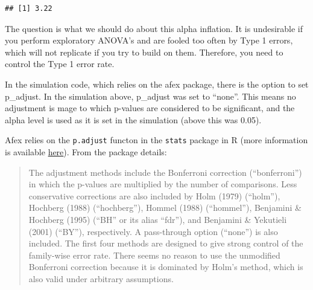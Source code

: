 \documentclass[]{book}
\newenvironment{Shaded}{\begin{snugshade}}{\end{snugshade}}
\newcommand{\ControlFlowTok}[1]{\textcolor[rgb]{0.13,0.29,0.53}{\textbf{#1}}}
\newcommand{\DecValTok}[1]{\textcolor[rgb]{0.00,0.00,0.81}{#1}}
\newcommand{\FloatTok}[1]{\textcolor[rgb]{0.00,0.00,0.81}{#1}}
\newcommand{\KeywordTok}[1]{\textcolor[rgb]{0.13,0.29,0.53}{\textbf{#1}}}
\newcommand{\NormalTok}[1]{#1}
\newcommand{\OperatorTok}[1]{\textcolor[rgb]{0.81,0.36,0.00}{\textbf{#1}}}
\newcommand{\StringTok}[1]{\textcolor[rgb]{0.31,0.60,0.02}{#1}}
\begin{document}
\begin{Shaded}
\end{Shaded}

\begin{verbatim}
## [1] 3.22
\end{verbatim}

The question is what we should do about this alpha inflation. It is undesirable if you perform exploratory ANOVA's and are fooled too often by Type 1 errors, which will not replicate if you try to build on them. Therefore, you need to control the Type 1 error rate.

In the simulation code, which relies on the afex package, there is the option to set p\_adjust. In the simulation above, p\_adjust was set to ``none''. This means no adjustment is mage to which p-values are considered to be significant, and the alpha level is used as it is set in the simulation (above this was 0.05).

Afex relies on the \texttt{p.adjust} functon in the \texttt{stats} package in R (more information is available \href{https://www.rdocumentation.org/packages/stats/versions/3.1.1/topics/p.adjust}{here}). From the package details:

\begin{quote}
The adjustment methods include the Bonferroni correction (``bonferroni'') in which the p-values are multiplied by the number of comparisons. Less conservative corrections are also included by Holm (1979) (``holm''), Hochberg (1988) (``hochberg''), Hommel (1988) (``hommel''), Benjamini \& Hochberg (1995) (``BH'' or its alias ``fdr''), and Benjamini \& Yekutieli (2001) (``BY''), respectively. A pass-through option (``none'') is also included. The first four methods are designed to give strong control of the family-wise error rate. There seems no reason to use the unmodified Bonferroni correction because it is dominated by Holm's method, which is also valid under arbitrary assumptions.
\end{quote}
\end{document}
